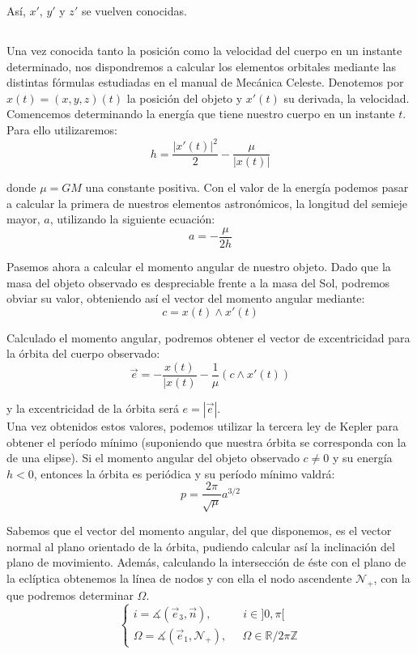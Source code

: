 \documentclass[11pt]{article}
\begin{document}
Así, $x'$, $y'$ y $z'$ se vuelven conocidas.\\

\subsection{}
\label{subsec:elements_determination}
Una vez conocida tanto la posición como la velocidad del cuerpo en un instante determinado, nos dispondremos a calcular los elementos orbitales mediante las distintas fórmulas estudiadas en el manual de Mecánica Celeste\cite{ortega}. Denotemos por $x(t)=(x,y,z)(t)$ la posición del objeto y $x'(t)$ su derivada, la velocidad.\\

Comencemos determinando la energía que tiene nuestro cuerpo en un instante $t$. Para ello utilizaremos:
\[
h=\frac{|x'(t)|^2}{2}-\frac{\mu}{|x(t)|}
\]

\noindent donde $\mu=GM$ una constante positiva. Con el valor de la energía podemos pasar a calcular la primera de nuestros elementos astronómicos, la longitud del semieje mayor, $a$, utilizando la siguiente ecuación:
\[
a=-\frac{\mu}{2h}
\]

Pasemos ahora a calcular el momento angular de nuestro objeto. Dado que la masa del objeto observado es despreciable frente a la masa del Sol, podremos obviar su valor, obteniendo así el vector del momento angular mediante:
\[
c=x(t)\wedge x'(t)
\]

Calculado el momento angular, podremos obtener el vector de excentricidad para la órbita del cuerpo observado:
\[
\vec{e}=-\frac{x(t)}{|x(t)}-\frac{1}{\mu}(c\wedge x'(t))
\]

\noindent y la excentricidad de la órbita será $e=|\vec{e}|$.\\

Una vez obtenidos estos valores, podemos utilizar la tercera ley de Kepler para obtener el período mínimo (suponiendo que nuestra órbita se corresponda con la de una elipse). Si el momento angular del objeto observado $c\neq0$ y su energía $h<0$, entonces la órbita es periódica y su período mínimo valdrá:
\[
p=\frac{2\pi}{\sqrt{\mu}}a^{3/2}
\]

Sabemos que el vector del momento angular, del que disponemos, es el vector normal al plano orientado de la órbita, pudiendo calcular así la inclinación del plano de movimiento. Además, calculando la intersección de éste con el plano de la eclíptica obtenemos la línea de nodos y con ella el nodo ascendente $\mathcal{N}_+$, con la que podremos determinar $\Omega$.
\[
\left\{
\begin{array}{l}
	i=\measuredangle(\vec{e}_3,\vec{n}), \; \; \; \; \; \; \; \; \; \; i\in]0,\pi[\\
	\Omega=\measuredangle(\vec{e}_1, \mathcal{N}_+), \; \; \; \; \; \Omega\in\mathbb{R}/2\pi\mathbb{Z}
\end{array}
\right.
\]
\end{document}
